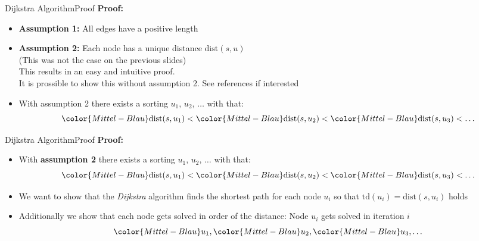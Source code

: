 \begin{frame}{Dijkstra Algorithm}{Proof}
  \textbf{Proof:}
  \begin{itemize}
    \item
      \textbf{Assumption 1:}
      All edges have a positive length
    \item
      \textbf{Assumption 2:}
      Each node has a unique distance
      {\color{Mittel-Blau}$\mathrm{dist}(s, u)$}\\
      {\color{gray}(This was not the case on the previous slides)}\\[0.5em]
      This results in an easy and intuitive proof.\\
      {\color{gray}
        It is prossible to show this without assumption 2.
        See references if interested}
      \vspace{1.0em}
    \item
      With assumption 2 there exists a sorting {\color{Mittel-Blau}$u_1$},
      {\color{Mittel-Blau}$u_2$}, $\ldots$ with that:
      \begin{displaymath}
        {\color{Mittel-Blau}\mathrm{dist}(s, u_1)} <
        {\color{Mittel-Blau}\mathrm{dist}(s, u_2)} <
        {\color{Mittel-Blau}\mathrm{dist}(s, u_3)} <
        \ldots
      \end{displaymath}
  \end{itemize}
\end{frame}


\begin{frame}{Dijkstra Algorithm}{Proof}
  \textbf{Proof:}
  \begin{itemize}
    \item
      With \textbf{assumption 2} there exists a sorting {\color{Mittel-Blau}$u_1$},
      {\color{Mittel-Blau}$u_2$}, $\ldots$ with that:
      \begin{displaymath}
        {\color{Mittel-Blau}\mathrm{dist}(s, u_1)} <
        {\color{Mittel-Blau}\mathrm{dist}(s, u_2)} <
        {\color{Mittel-Blau}\mathrm{dist}(s, u_3)} <
        \ldots
      \end{displaymath}
    \item
      We want to show that the \textit{Dijkstra} algorithm finds the shortest
      path for each node {\color{Mittel-Blau}$u_i$} so that
      {\color{Mittel-Blau}$\mathrm{td}(u_i) = \mathrm{dist}(s, u_i)$} holds
    \item
      Additionally we show that each node gets solved in order of the distance:
      Node {\color{Mittel-Blau}$u_i$} gets solved in iteration
      {\color{Mittel-Blau}$i$}
      \begin{displaymath}
        {\color{Mittel-Blau}u_1},
        {\color{Mittel-Blau}u_2},
        {\color{Mittel-Blau}u_3},
        \ldots
      \end{displaymath}
  \end{itemize}
\end{frame}

